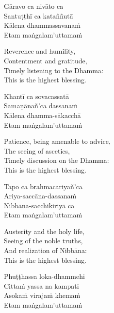 \begin{pali-hang-continued}
  Gāravo ca nivāto ca\\
  Santuṭṭhī ca kataññutā\\
  Kālena dhammassavanaṁ\\
  Etam maṅgalam'uttamaṁ
\end{pali-hang-continued}

\begin{english-verses}
  Reverence and humility,\\
  Contentment and gratitude,\\
  Timely listening to the Dhamma:\\
  This is the highest blessing.
\end{english-verses}

\begin{pali-hang-continued}
  Khantī ca sovacassatā\\
  Samaṇānañ'ca dassanaṁ\\
  Kālena dhamma-sākacchā\\
  Etam maṅgalam'uttamaṁ
\end{pali-hang-continued}

\begin{english-verses}
  Patience, being amenable to advice,\\
  The seeing of ascetics,\\
  Timely discussion on the Dhamma:\\
  This is the highest blessing.
\end{english-verses}

\begin{pali-hang-continued}
  Tapo ca brahmacariyañ'ca\\
  Ariya-saccāna-dassanaṁ\\
  Nibbāna-sacchikiriyā ca\\
  Etam maṅgalam'uttamaṁ
\end{pali-hang-continued}

\begin{english-verses}
  Austerity and the holy life,\\
  Seeing of the noble truths,\\
  And realization of Nibbāna:\\
  This is the highest blessing.
\end{english-verses}

\begin{pali-hang-continued}
  Phuṭṭhassa loka-dhammehi\\
  Cittaṁ yassa na kampati\\
  Asokaṁ virajaṁ khemaṁ\\
  Etam maṅgalam'uttamaṁ
\end{pali-hang-continued}

